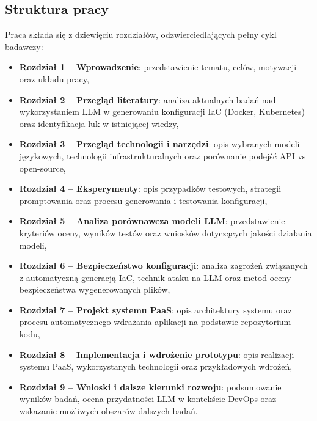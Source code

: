 \subsection{Struktura pracy}

Praca składa się z dziewięciu rozdziałów, odzwierciedlających pełny cykl badawczy:
\begin{itemize}
    \item \textbf{Rozdział 1 – Wprowadzenie}: przedstawienie tematu, celów, motywacji oraz układu pracy,
    \item \textbf{Rozdział 2 – Przegląd literatury}: analiza aktualnych badań nad wykorzystaniem LLM w generowaniu konfiguracji IaC (Docker, Kubernetes) oraz identyfikacja luk w   istniejącej wiedzy,
    \item \textbf{Rozdział 3 – Przegląd technologii i narzędzi}: opis wybranych modeli językowych, technologii infrastrukturalnych oraz porównanie podejść API vs open-source,
    \item \textbf{Rozdział 4 – Eksperymenty}: opis przypadków testowych, strategii promptowania oraz procesu generowania i testowania konfiguracji,
    \item \textbf{Rozdział 5 – Analiza porównawcza modeli LLM}: przedstawienie kryteriów oceny, wyników testów oraz wniosków dotyczących jakości działania modeli,
    \item \textbf{Rozdział 6 – Bezpieczeństwo konfiguracji}: analiza zagrożeń związanych z automatyczną generacją IaC, technik ataku na LLM oraz metod oceny bezpieczeństwa wygenerowanych plików,
    \item \textbf{Rozdział 7 – Projekt systemu PaaS}: opis architektury systemu oraz procesu automatycznego wdrażania aplikacji na podstawie repozytorium kodu,
    \item \textbf{Rozdział 8 – Implementacja i wdrożenie prototypu}: opis realizacji systemu PaaS, wykorzystanych technologii oraz przykładowych wdrożeń,
    \item \textbf{Rozdział 9 – Wnioski i dalsze kierunki rozwoju}: podsumowanie wyników badań, ocena przydatności LLM w kontekście DevOps oraz wskazanie możliwych obszarów dalszych badań.
\end{itemize}
